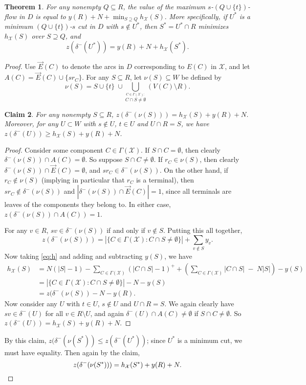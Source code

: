 \documentclass[11pt, letterpaper]{article}
\newtheorem{theorem}{Theorem}[section]
\newtheorem{claim}[theorem]{Claim}
\theoremstyle{definition}
\newcommand{\grphx}{\mathcal{X}}
\newcommand{\compof}[1]{\Gamma(#1)}
\newcommand{\compx}{\compof{\grphx}}
\newcommand{\slkx}{h_{\grphx}}
\newcommand{\dirE}{\vec{E}}
\begin{document}
\begin{theorem}\label{thm:separation}
	For any nonempty $Q \subseteq R$, the value of the maximum $s$-$(Q \cup \{t\})$-flow in $D$ is equal to $y(R) + N + \min_{S \supseteq Q} \slkx(S)$.
	More specifically, if $U^*$ is a minimum $(Q \cup \{t\})$-$s$ cut in $D$ with $s \notin U^*$, then $S^* = U^* \cap R$ minimizes $\slkx(S)$ over $S \supseteq Q$, and 
\[  z(\delta^-(U^*)) =  y(R) + N+ \slkx(S^*). \]
\end{theorem}
\begin{proof}
Use $\dirE(C)$ to denote the arcs in $D$ corresponding to $E(C)$ in $\grphx$, and let $A(C) = \dirE(C) \cup \{sr_C\}$.
For any $S \subseteq R$, let $\nu(S) \subseteq W$ be defined by 
\[ \nu(S) = S \cup \{t\} \; \cup \bigcup_{\stackrel{C \in \compx:}{C \cap S \neq \emptyset}} (V(C) \setminus R). \]
\begin{claim}
	For any nonempty $S \subseteq R$, $z(\delta^-(\nu(S))) = \slkx(S) + y(R) + N$. Moreover, for any $U \subset W$ with $s \notin U$, $t \in U$ and $U \cap R = S$, we have $z(\delta^-(U)) \geq \slkx(S) + y(R) + N$.
\end{claim}
\begin{proof}
Consider some component $C \in \compx$. 
If $S \cap C = \emptyset$, then clearly $\delta^-(\nu(S)) \cap A(C) = \emptyset$. 
So suppose $S \cap C \neq \emptyset$. 
If $r_C \in \nu(S)$, then clearly $\delta^-(\nu(S)) \cap \dirE(C) = \emptyset$, and $sr_C \in \delta^-(\nu(S))$. 
On the other hand, if $r_C \notin \nu(S)$ (implying in particular that $r_C$ is a terminal), then $sr_C \notin \delta^-(\nu(S))$ and $|\delta^-(\nu(S)) \cap \dirE(C)| = 1$, since all terminals are leaves of the components they belong to.
In either case, $z(\delta^-(\nu(S)) \cap A(C)) = 1$. 

For any $v \in R$, $sv \in \delta^-(\nu(S))$ if and only if $v \notin S$. Putting this all together, 
\[  z(\delta^-(\nu(S))) =  |\{C \in \compx: C \cap S \neq \emptyset\}| + \sum_{v \notin S} y_v.\]
Now taking \eqref{eq:h} and adding and subtracting $y(S)$, we have
\begin{align*}
\slkx(S) &= N(|S|-1) -\sum_{C \in \compx} (|C \cap S|-1)^+  + \left(\sum_{C \in \compx} |C \cap S| \;-\; N|S|\right) - y(S)\\
&= |\{C \in \compx: C \cap S \neq \emptyset\}|  - N - y(S)\\
&= z(\delta^-(\nu(S)) - N - y(R).
\end{align*}
Now consider any $U$ with $t \in U$, $s \notin U$ and $U \cap R = S$. We again clearly have $sv \in \delta^-(U)$ for all $v \in R \setminus U$, and again $\delta^-(U) \cap A(C) \neq \emptyset$ if $S \cap C \neq \emptyset$. So $z(\delta^-(U)) = \slkx(S) + y(R) + N$.
\end{proof}
By this claim, $z(\delta^-(\nu(S^*)) \leq z(\delta^-(U^*))$; since $U^*$ is a minimum cut, we must have equality.
Then again by the claim, 
\[ z(\delta^-(\nu(S^*))) = \slkx(S^*) + y(R) + N.  \qedhere \] 
\end{proof}
\end{document}
